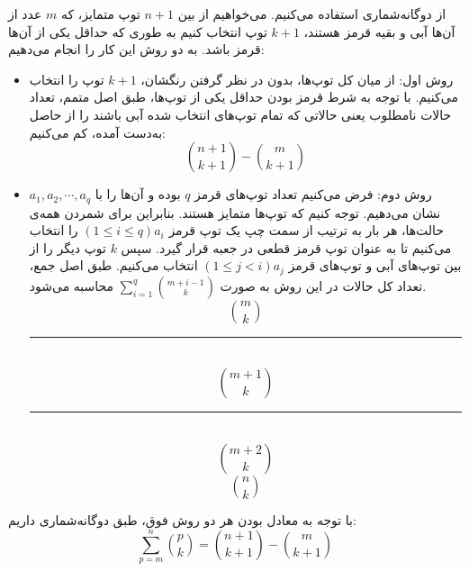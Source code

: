 \p		
از دوگانه‌شماری استفاده می‌کنیم. می‌خواهیم از بین
$n + 1$
توپ متمایز، که 
$m$
عدد از آن‌ها آبی و بقیه قرمز هستند، 
$k + 1$
توپ انتخاب کنیم به طوری که حداقل یکی از آن‌ها قرمز باشد. به دو روش این کار را انجام می‌دهیم:
\begin{itemize}
\item
روش اول: 
از میان کل توپ‌ها، بدون در نظر گرفتن رنگشان،
 $k + 1$
توپ را انتخاب می‌کنیم. با توجه به شرط قرمز بودن حداقل یکی از توپ‌ها، طبق اصل متمم، تعداد حالات نامطلوب یعنی حالاتی که تمام توپ‌های انتخاب شده آبی باشند را از حاصل به‌دست آمده، کم می‌کنیم:
$$\binom{n + 1}{k + 1} - \binom{m}{k + 1}$$
\item 
روش دوم:
فرض می‌کنیم تعداد توپ‌های قرمز
$q$
بوده و آن‌ها را با
$a_1, a_2, \cdots, a_q$
نشان می‌دهیم. 
توجه کنیم که توپ‌ها متمایز هستند. بنابراین برای شمردن همه‌ی حالت‌ها، هر بار به ترتیب از سمت چپ یک توپ قرمز 
$(1\leq i\leq q) a_i$
 را انتخاب می‌کنیم تا به عنوان توپ قرمز قطعی در جعبه قرار گیرد.
سپس 
 $k$
 توپ دیگر را از بین توپ‌های آبی و توپ‌های قرمز 
 $(1\leq j<i) a_j$
  انتخاب می‌کنیم.
طبق اصل جمع، تعداد کل حالات در این روش به صورت
 $\sum\limits_{i=1}^{q}\binom{m+i-1}{k}$
محاسبه می‌شود.
\newpage
\p
{}
$$\binom{m}{k}$$
\hrule
\p
\\
 $$\binom{m + 1}{k}$$
 \hrule
\p
\\
  $$\binom{m + 2}{k}$$
  \newpage
 \p
 $$\binom{n}{k}$$

\end{itemize}
با ‌توجه به معادل بودن هر دو روش فوق، طبق دوگانه‌شماری داریم:
$$\sum\limits_{p=m}^{n}\binom{p}{k} = \binom{n + 1}{k + 1} - \binom{m}{k + 1}$$